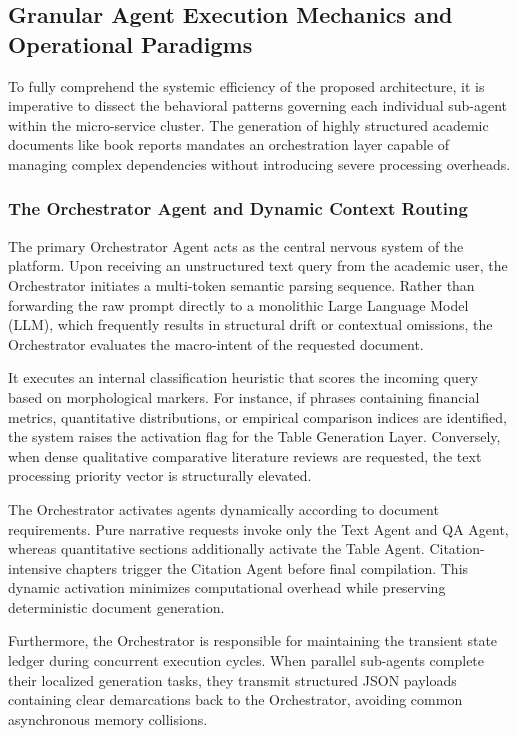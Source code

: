 \subsection{Granular Agent Execution Mechanics and Operational Paradigms}
To fully comprehend the systemic efficiency of the proposed architecture, it is imperative to dissect the behavioral patterns governing each individual sub-agent within the micro-service cluster. The generation of highly structured academic documents like book reports mandates an orchestration layer capable of managing complex dependencies without introducing severe processing overheads.

\subsubsection{The Orchestrator Agent and Dynamic Context Routing}
The primary Orchestrator Agent acts as the central nervous system of the platform. Upon receiving an unstructured text query from the academic user, the Orchestrator initiates a multi-token semantic parsing sequence. Rather than forwarding the raw prompt directly to a monolithic Large Language Model (LLM), which frequently results in structural drift or contextual omissions, the Orchestrator evaluates the macro-intent of the requested document. 

It executes an internal classification heuristic that scores the incoming query based on morphological markers. For instance, if phrases containing financial metrics, quantitative distributions, or empirical comparison indices are identified, the system raises the activation flag for the Table Generation Layer. Conversely, when dense qualitative comparative literature reviews are requested, the text processing priority vector is structurally elevated.

The Orchestrator activates agents dynamically according to document requirements. Pure narrative requests invoke only the Text Agent and QA Agent, whereas quantitative sections additionally activate the Table Agent. Citation-intensive chapters trigger the Citation Agent before final compilation. This dynamic activation minimizes computational overhead while preserving deterministic document generation.

Furthermore, the Orchestrator is responsible for maintaining the transient state ledger during concurrent execution cycles. When parallel sub-agents complete their localized generation tasks, they transmit structured JSON payloads containing clear demarcations back to the Orchestrator, avoiding common asynchronous memory collisions.

